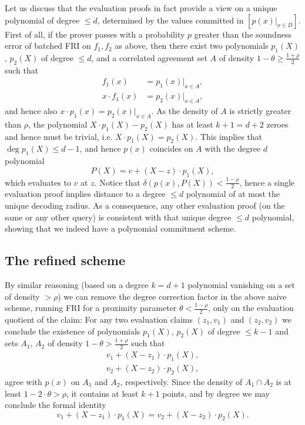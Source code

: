 \documentclass[11pt,article,oneside]{memoir}
\theoremstyle{definition}
\theoremstyle{remark}
\begin{document}
Let us discuss that the evaluation proofs in fact provide a view on a unique polynomial of degree $\leq d$, determined by the values committed in $[p(x)|_{x\in D}]$.
First of all, if the prover passes with a probability $p$ greater than the soundness error of batched FRI on $f_1, f_2$ as above,  then there exist two polynomials $p_1(X)$, $p_2(X)$ of degree $\leq d$, and a correlated agreement set $A$ of density $1-\theta \geq \frac{1+\rho}{2}$ such that
\begin{align*}
f_1(x) &=p_1(x) \big|_{x\in A},
\\
x\cdot f_1(x) &= p_2(x)\big|_{x\in A},
\end{align*}
and hence also $x\cdot p_1(x) =p_2(x)\big|_{x\in A}$. 
As the density of $A$ is strictly greater than $\rho$, the polynomial $X\cdot p_1(X)-p_2(X)$ has at least $k+1=d+2$ zeroes and hence must be trivial, i.e. $X\cdot p_1(X) = p_2(X)$. 
This implies that $\deg p_1(X)\leq d-1$, and hence $p(x)$ coincides on $A$ with the degree $d$ polynomial 
\[
P(X)= v + (X-z)\cdot p_1(X),
\]
which evaluates to $v$ at $z$. 
Notice that $\delta(p(x),P(X)) < \frac{1-\rho}{2}$, hence a single evaluation proof implies distance to a degree $\leq d$ polynomial of at most the unique decoding radius. 
As a consequence, any other evaluation proof (on the same or any other query) is consistent with that unique degree $\leq d$ polynomial, showing that we indeed have a polynomial commitment scheme.

\subsection{The refined scheme}

By similar reasoning (based on a degree $k=d+1$ polynomial vanishing on a set of density $>\rho$)  we can  remove the degree correction factor in the above naive scheme, running FRI for a proximity parameter $\theta < \frac{1-\rho}{2}$, only on the evaluation quotient of the claim: 
For any two evaluation claims $(z_1,v_1)$ and $(z_2, v_2)$ we conclude the existence of polynomials $p_1(X)$, $p_2(X)$ of degree $\leq k-1$ and sets $A_1$, $A_2$ of density $1-\theta > \frac{1+\rho}{2}$ such that
\[
\begin{aligned}
v_1 + (X-z_1)\cdot p_1(X),
\\
v_2 + (X-z_2)\cdot p_2(X),
\end{aligned}
\]
agree with $p(x)$  on $A_1$ and $A_2$, respectively.
Since the density of $A_1\cap A_2$ is at least $1 - 2\cdot \theta > \rho$, it contains at least $k + 1$ points, and by degree we may conclude the formal identity
\[
v_1 + (X-z_1)\cdot p_1(X) = v_2 + (X-z_2)\cdot p_2(X).
\]
\end{document}
